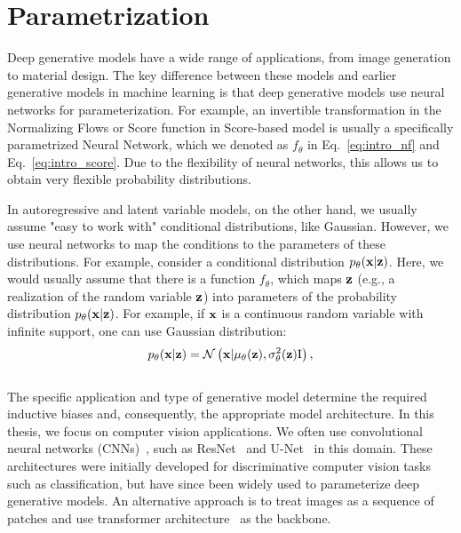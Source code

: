 \section{Parametrization}\label{sec:intro_parametrization}
Deep generative models have a wide range of applications, from image generation to material design. The key difference between these models and earlier generative models in machine learning is that deep generative models use neural networks for parameterization. 
For example, an invertible transformation in the Normalizing Flows or Score function in Score-based model is usually a specifically parametrized Neural Network, which we denoted as $f_{\theta}$ in Eq.~\ref{eq:intro_nf} and Eq.~\ref{eq:intro_score}. Due to the flexibility of neural networks, this allows us to obtain very flexible probability distributions. 

In autoregressive and latent variable models, on the other hand, we usually assume "easy to work with" conditional distributions, like Gaussian. However, we use neural networks to map the conditions to the parameters of these distributions. 
For example, consider a conditional distribution $p_{\theta}({\mathbf{x}}|{\mathbf{z}})$. Here, we would usually assume that there is a function $f_{\theta}$, which maps ${\mathbf{z}}$ (e.g., a realization of the random variable ${\mathbf{z}}$) into parameters of the probability distribution $p_{\theta}({\mathbf{x}}|{\mathbf{z}})$. For example, if ${\mathbf{x}}$ is a continuous random variable with infinite support, one can use Gaussian distribution:
\begin{equation}
    p_{\theta}({\mathbf{x}}|{\mathbf{z}}) = \mathcal{N}\left({\mathbf{x}}| \mu_{\theta}({\mathbf{z}}), \sigma^2_{\theta}({\mathbf{z}}) \text{I}\right),
\end{equation}
\\
The specific application and type of generative model determine the required inductive biases and, consequently, the appropriate model architecture.
In this thesis, we focus on computer vision applications. We often use convolutional neural networks (CNNs)~\citep{krizhevsky2012imagenet}, such as ResNet~\citep{he2016deep} and U-Net~\citep{ronneberger2015u} in this domain. 
These architectures were initially developed for discriminative computer vision tasks such as classification, but have since been widely used to parameterize deep generative models. An alternative approach is to treat images as a sequence of patches and use transformer architecture~\citep{dosovitskiy2021an} as the backbone.

